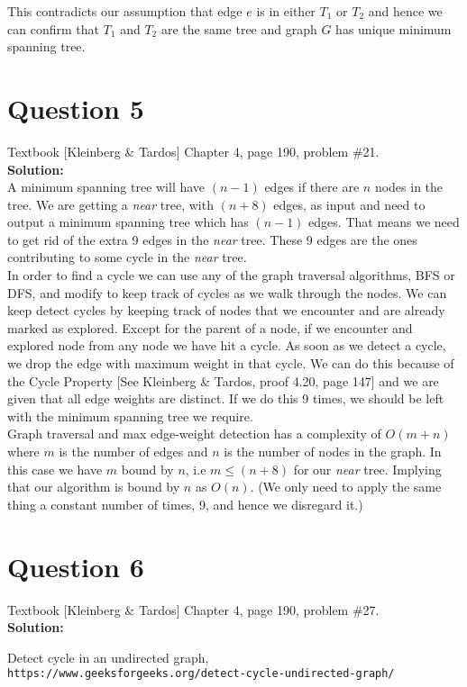 \documentclass[11pt]{article}
\begin{document}
This contradicts our assumption that edge $ e $ is in either $ T_1 $ or $ T_2 $ and hence we can confirm that $ T_1 $ and $ T_2 $ are the same tree and graph $ G $ has unique minimum spanning tree.

\clearpage
\section{Question 5} Textbook [Kleinberg \& Tardos] Chapter 4, page 190, problem \#21. \\
\textbf{Solution:} \\

A minimum spanning tree will have $ (n-1) $ edges if there are $ n $ nodes in the tree. We are getting a \textit{near} tree, with $ (n+8) $ edges, as input and need to output a minimum spanning tree which has $ (n-1) $ edges. That means we need to get rid of the extra 9 edges in the \textit{near} tree. These 9 edges are the ones contributing to some cycle in the \textit{near} tree. \\

In order to find a cycle we can use any of the graph traversal algorithms, BFS or DFS, and modify to keep track of cycles as we walk through the nodes\cite{GeeksforGeeks}. We can keep detect cycles by keeping track of nodes that we encounter and are already marked as explored. Except for the parent of a node, if we encounter and explored node from any node we have hit a cycle. As soon as we detect a cycle, we drop the edge with maximum weight in that cycle. We can do this because of the Cycle Property [See Kleinberg \& Tardos, proof 4.20, page 147] and we are given that all edge weights are distinct. If we do this 9 times, we should be left with the minimum spanning tree we require. \\

Graph traversal and max edge-weight detection has a complexity of $ O(m+n) $ where $ m $ is the number of edges and $ n $ is the number of nodes in the graph. In this case we have $ m $ bound by $ n $, i.e $ m \leq (n+8) $ for our \textit{near} tree. Implying that our algorithm is bound by $ n $ as $ O(n) $. (We only need to apply the same thing a constant number of times, 9, and hence we disregard it.) \\

\clearpage
\section{Question 6} Textbook [Kleinberg \& Tardos] Chapter 4, page 190, problem \#27. \\
\textbf{Solution:} \\

\clearpage

\begin{thebibliography}{9}
	Detect cycle in an undirected graph,
	\\\texttt{https://www.geeksforgeeks.org/detect-cycle-undirected-graph/}
	
\end{thebibliography}
\end{document}
